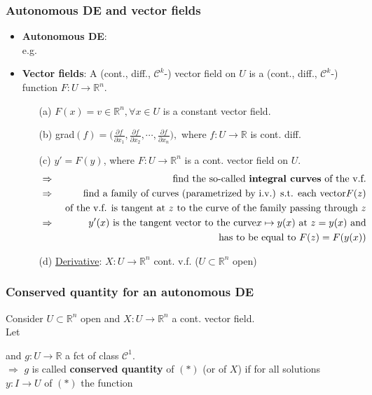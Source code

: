 \documentclass[10pt]{beamer}
\newcommand{\R}{\mathbb{R}}
\begin{document}
{\begin{frame}\frametitle{Autonomous DE and vector fields}
\begin{itemize}
\item \textbf{Autonomous DE}: \\
e.g.
\vspace{0.5cm}
\item \textbf{Vector fields}: A (cont., diff., $\mathcal{C}^k$-) vector field on $U$ is a (cont., diff., $\mathcal{C}^k$-) function $F:U \rightarrow \R^n$.\\
\begin{itemize}
\item[(a)] $F(x)=v \in \R^n, \forall x\in U$ is a constant vector field.\\
\vspace{0.2cm}
\item[(b)] grad$(f)=\Big(\frac{\partial f}{\partial x_1},\frac{\partial f}{\partial x_2},\cdots, \frac{\partial f}{\partial x_n}\Big), $ where $f:U \rightarrow \R$ is cont. diff.\\
\vspace{0.2cm}
\item[(c)] $y'=F(y)$, where $F:U \rightarrow \R^n$ is a cont.  vector field on $U$.
\begin{eqnarray*}
&\Rightarrow& \text{ find the so-called \textbf{integral curves} of the v.f.}\\
&\Rightarrow& \text{ find a family of curves (parametrized by i.v.) s.t. each vector} F(z) \\
&& \text{ of the v.f. is tangent at } z \text{ to the curve of the family passing through } z\\
&\Rightarrow& y'(x) \text{ is the tangent vector to the curve} x\mapsto y(x) \text{ at } z=y(x) \text{ and}\\
&& \text{ has to be equal to } F(z)=F(y(x))
\end{eqnarray*}

\item[(d)] \underline{Derivative}: $X: U \rightarrow \R^n$ cont. v.f. ($U \subset \R^n$ open)\\
\vspace{2.5cm}
\end{itemize}
\end{itemize}
\end{frame}


\begin{frame}\frametitle{Conserved quantity for an autonomous DE}
Consider $U \subset \R^n$ open and $X: U \rightarrow \R^n$ a cont. vector field.\\
Let 
\begin{block}{}
\vspace{0.5cm}
\end{block}
and $g:U \rightarrow \R$ a fct of class $\mathcal{C}^1$.\\
$\Rightarrow$ $g$ is called \textbf{conserved quantity} of $(*)$ (or of $X$) if for all solutions $y:I \rightarrow U$ of $(*)$ the function
$$\;$$ %


\end{frame}}
\end{document}
